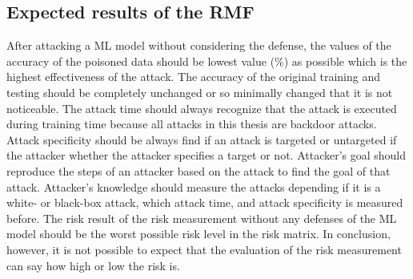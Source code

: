 \subsection{Expected results of the RMF}

After attacking a ML model without considering the defense, the values of the accuracy of the poisoned data should be lowest value (\%) as possible which is the highest effectiveness of the attack. The accuracy of the original training and testing should be completely unchanged or so minimally changed that it is not noticeable. The attack time should always recognize that the attack is executed during training time because all attacks in this thesis are backdoor attacks. Attack specificity should be always find if an attack is targeted or untargeted if the attacker whether the attacker specifies a target or not. Attacker's goal should reproduce the steps of an attacker based on the attack to find the goal of that attack. Attacker's knowledge should measure the attacks depending if it is a white- or black-box attack, which attack time, and attack specificity is measured before. The risk result of the risk measurement without any defenses of the ML model should be the worst possible risk level in the risk matrix. In conclusion, however, it is not possible to expect that the evaluation of the risk measurement can say how high or low the risk is.
